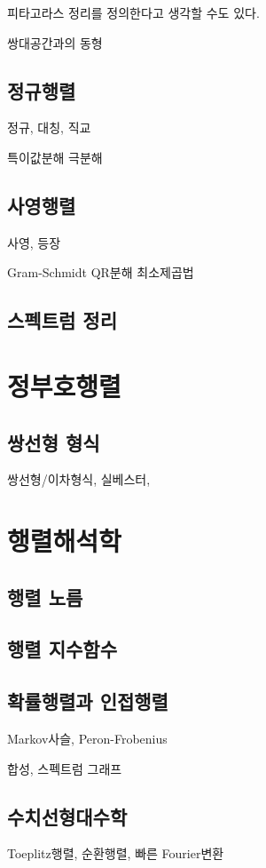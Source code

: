 \documentclass{../../large}
\begin{document}
피타고라스 정리를 정의한다고 생각할 수도 있다.

쌍대공간과의 동형



\section{정규행렬}

정규, 대칭, 직교


특이값분해
극분해

\section{사영행렬}

사영, 등장


Gram-Schmidt
QR분해
최소제곱법

\section{스펙트럼 정리}









\chapter{정부호행렬}

\section{쌍선형 형식}
쌍선형/이차형식, 실베스터,

\section{}







\chapter{행렬해석학}

\section{행렬 노름}

\section{행렬 지수함수}

\section{확률행렬과 인접행렬}

Markov사슬, Peron-Frobenius

합성, 스펙트럼 그래프

\section{수치선형대수학}
Toeplitz행렬, 순환행렬, 빠른 Fourier변환
\end{document}
